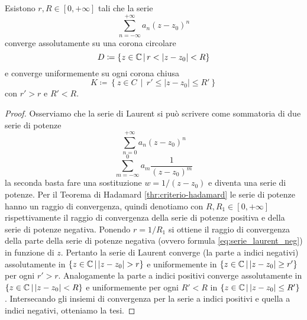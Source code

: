 \begin{proposition}
  Esistono $r, R \in \left[ 0, +\infty \right]$ tali che la serie 
  \begin{equation*}
    \sum_{n=-\infty}^{+\infty} a_n(z-z_0)^n
  \end{equation*}
  converge assolutamente su una corona circolare 
  \begin{equation*}
    D \coloneqq \left\{ z \in \mathbb{C} \,\middle|\, r < |z-z_0| < R \right\}
  \end{equation*}
  e converge uniformemente su ogni corona chiusa
  \begin{equation*}
    K \coloneqq \left\{ z \in C \,\middle|\, r' \le |z-z_0| \le R' \right\}
  \end{equation*}
  con $r' > r$ e $R' < R$.
  \label{prp:convergenza_ass_unif_laurent}
\end{proposition}
\begin{proof}
  Osserviamo che la serie di Laurent si può scrivere come sommatoria di due serie di
  potenze
  \begin{equation*}
  \sum_{n=0}^{+\infty} a_n (z-z_0)^{n} 
  \end{equation*}
  \begin{equation}
  	\label{eq:serie_laurent_neg}
  \sum_{m=-\infty}^{0} a_{m} \frac{1}{(z-z_0)^{m}}
  \end{equation}
  la seconda basta fare una sostituzione $w = 1/(z-z_0)$ e diventa una serie di
  potenze.
  Per il Teorema di Hadamard \ref{thr:criterio-hadamard} le serie di potenze
  hanno un raggio di convergenza, quindi denotiamo con $R, R_1 \in \left[ 0, 
  +\infty \right]$ rispettivamente il raggio di convergenza della serie di
  potenze positiva e della serie di potenze
  negativa. Ponendo $r = 1/R_1$ si ottiene il raggio di
  convergenza della parte della serie di potenze negativa (ovvero formula
  \ref{eq:serie_laurent_neg}) in funzione di $z$. Pertanto la serie di Laurent
  converge (la parte a indici negativi) assolutamente in 
  $\left\{z \in \mathbb{C} \,\middle|\, |z-z_0| > r \right\}$
  e uniformemente in $\left\{ z \in \mathbb{C} \,\middle|\, |z-z_0| \ge r' \right\}$ per
  ogni $r' > r$. Analogamente la parte a indici positivi converge assolutamente
  in $\left\{ z \in \mathbb{C} \,\middle|\, |z -z_0| < R  \right\}$ e uniformemente per
  ogni $R' < R$ in $\left\{ z \in \mathbb{C} \,\middle|\, |z -z_0| \le R'  \right\}$.
  Intersecando gli insiemi di convergenza per la serie a indici positivi
  e quella a indici negativi, otteniamo la tesi.
\end{proof}

